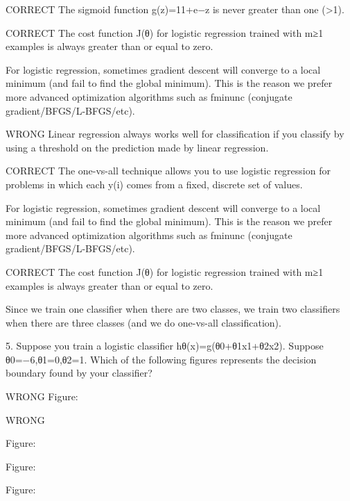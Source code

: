 CORRECT The sigmoid function g(z)=11+e−z is never greater than one (>1).

CORRECT The cost function J(θ) for logistic regression trained with m≥1 examples is always greater than or equal to zero.

For logistic regression, sometimes gradient descent will converge to a local minimum (and fail to find the global minimum). This is the reason we prefer more advanced optimization algorithms such as fminunc (conjugate gradient/BFGS/L-BFGS/etc).

WRONG Linear regression always works well for classification if you classify by using a threshold on the prediction made by linear regression.


CORRECT The one-vs-all technique allows you to use logistic regression for problems in which each y(i) comes from a fixed, discrete set of values.

For logistic regression, sometimes gradient descent will converge to a local minimum (and fail to find the global minimum). This is the reason we prefer more advanced optimization algorithms such as fminunc (conjugate gradient/BFGS/L-BFGS/etc).

CORRECT The cost function J(θ) for logistic regression trained with m≥1 examples is always greater than or equal to zero.

Since we train one classifier when there are two classes, we train two classifiers when there are three classes (and we do one-vs-all classification).


5. 
Suppose you train a logistic classifier hθ(x)=g(θ0+θ1x1+θ2x2). Suppose θ0=−6,θ1=0,θ2=1. Which of the following figures represents the decision boundary found by your classifier?

WRONG %
Figure:


WRONG

Figure:



Figure:



Figure:



